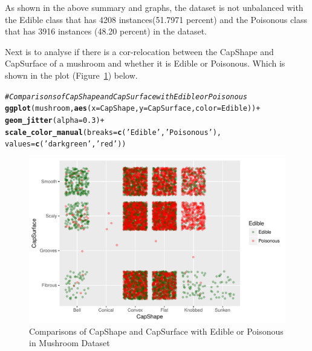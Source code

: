 \documentclass[10pt  ,usenames, dvipsnames]{article}\usepackage[]{graphicx}\usepackage[]{color}
\makeatletter
\newcommand{\hlnum}[1]{\textcolor[rgb]{0.686,0.059,0.569}{#1}}%
\newcommand{\hlstr}[1]{\textcolor[rgb]{0.192,0.494,0.8}{#1}}%
\newcommand{\hlcom}[1]{\textcolor[rgb]{0.678,0.584,0.686}{\textit{#1}}}%
\newcommand{\hlopt}[1]{\textcolor[rgb]{0,0,0}{#1}}%
\newcommand{\hlstd}[1]{\textcolor[rgb]{0.345,0.345,0.345}{#1}}%
\newcommand{\hlkwc}[1]{\textcolor[rgb]{0.333,0.667,0.333}{#1}}%
\newcommand{\hlkwd}[1]{\textcolor[rgb]{0.737,0.353,0.396}{\textbf{#1}}}%
\newenvironment{kframe}{%
 \def\at@end@of@kframe{}%
 \ifinner\ifhmode%
  \def\at@end@of@kframe{\end{minipage}}%
  \begin{minipage}{\columnwidth}%
 \fi\fi%
 \def\FrameCommand##1{\hskip\@totalleftmargin \hskip-\fboxsep
 \colorbox{shadecolor}{##1}\hskip-\fboxsep
     \hskip-\linewidth \hskip-\@totalleftmargin \hskip\columnwidth}%
 \MakeFramed {\advance\hsize-\width
   \@totalleftmargin\z@ \linewidth\hsize
   \@setminipage}}%
 {\par\unskip\endMakeFramed%
 \at@end@of@kframe}
\newenvironment{knitrout}{}{} %
\makeatother
\begin{document}
As shown in the above summary and graphs, the dataset is not unbalanced with the Edible class that has 4208 instances(51.7971 percent) and the Poisonous class that has 3916 instances (48.20 percent) in the dataset.
\clearpage

Next is to analyse if there is a cor-relocation between the CapShape and CapSurface of a mushroom and whether it is Edible or Poisonous. Which is shown in the plot (Figure~\ref{fig2}) below.

\begin{knitrout}
\color{fgcolor}\begin{kframe}
\begin{alltt}
\hlcom{#Comparisons of CapShape and CapSurface with Edible or Poisonous}
\hlkwd{ggplot}\hlstd{(mushroom,}\hlkwd{aes}\hlstd{(}\hlkwc{x}\hlstd{=CapShape,} \hlkwc{y}\hlstd{=CapSurface,} \hlkwc{color}\hlstd{=Edible))} \hlopt{+}
                       \hlkwd{geom_jitter}\hlstd{(}\hlkwc{alpha}\hlstd{=}\hlnum{0.3}\hlstd{)} \hlopt{+}
                       \hlkwd{scale_color_manual}\hlstd{(}\hlkwc{breaks} \hlstd{=} \hlkwd{c}\hlstd{(}\hlstr{'Edible'}\hlstd{,}\hlstr{'Poisonous'}\hlstd{),}
                                          \hlkwc{values}\hlstd{=}\hlkwd{c}\hlstd{(}\hlstr{'darkgreen'}\hlstd{,}\hlstr{'red'}\hlstd{))}
\end{alltt}
\end{kframe}
\end{knitrout}




\begin{figure}[H]
\begin{center}
\begin{knitrout}
\color{fgcolor}
\includegraphics[width=.76\linewidth]{figure/unnamed-chunk-18-1} 

\end{knitrout}
\caption {Comparisons of CapShape and CapSurface with Edible or Poisonous in Mushroom Dataset}
\label{fig2}
\end {center}
\end {figure}
\end{document}
